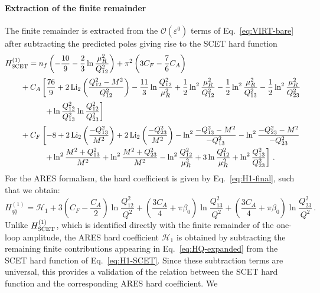 \paragraph{Extraction of the finite remainder}
The finite remainder is extracted from the
$\mathcal{O}(\varepsilon^0)$ terms of Eq.~\eqref{eq:VIRT-bare}
after subtracting the predicted poles giving rise to
the SCET hard function
\begin{equation}
\label{eq:H1-SCET}
\begin{aligned}
& H^{(1)}_{\rm SCET}=n_f\left(-\frac{10}{9}-\frac{2}{3}\ln\frac{\mu_R^2}{Q_{12}^2}\right)+\pi^2\left(
3C_F-\frac{7}{6}C_A
\right)\\[0.5ex]
& \qquad+C_A\left[
\frac{76}{9}
+2\operatorname{Li}_2\left(\frac{Q_{12}^2-M^2}{Q_{12}^2}\right)
-\frac{11}{3}\ln\frac{Q_{12}^2}{\mu_R^2}
+\frac{1}{2}\ln^2\frac{\mu_R^2}{Q_{12}^2}
-\frac{1}{2}\ln^2\frac{\mu_R^2}{Q_{13}^2}
-\frac{1}{2}\ln^2\frac{\mu_R^2}{Q_{23}^2}\right.\\[0.5ex]
&\quad\qquad\qquad\left.+\ln\frac{Q_{12}^2}{Q_{13}^2}
 \ln\frac{Q_{12}^2}{Q_{23}^2}
\right]\\[0.5ex]
&\qquad+C_F\left[-8
+2\operatorname{Li}_2\left(\frac{-Q_{13}^2}{M^2}\right)
+2\operatorname{Li}_2\left(\frac{-Q_{23}^2}{M^2}\right)
-\ln^2\frac{-Q_{13}^2-M^2}{-Q_{13}^2}
-\ln^2\frac{-Q_{23}^2-M^2}{-Q_{23}^2}\right.\\
&\quad\qquad\qquad\left.
+\ln^2\frac{M^2+Q_{13}^2}{M^2}
+\ln^2\frac{M^2+Q_{23}^2}{M^2}
-\ln^2\frac{Q_{12}^2}{\mu_R^2}
+3\ln\frac{Q_{12}^2}{\mu_R^2}
+\ln^2\frac{Q_{13}^2}{Q_{23}^2}
\right]\,.
\end{aligned}
\end{equation}
For the \textsc{ARES} formalism, the hard coefficient is given by
Eq.~\eqref{eq:H1-final}, such that we obtain: 
\begin{equation}
H_{q\bar{q}}^{(1)}=\mathcal{H}_1
+3\left(C_F-\frac{C_A}{2}\right)\ln\frac{Q_{12}^2}{Q^2}
+\left(\frac{3C_A}{4}+\pi\beta_0\right)\ln\frac{Q_{13}^2}{Q^2}
+\left(\frac{3C_A}{4}+\pi\beta_0\right)\ln\frac{Q_{23}^2}{Q^2}\,.
\end{equation}
Unlike $H_{\rm SCET}^{(1)}$, which is identified directly with the finite
remainder of the one-loop amplitude, the \textsc{ARES} hard coefficient
$\mathcal H_1$ is obtained by subtracting the remaining finite
contributions appearing in Eq.~\eqref{eq:HQ-expanded} from the SCET hard
function of Eq.~\eqref{eq:H1-SCET}. Since these subtraction terms are
universal, this provides a validation of the relation between the SCET
hard function and the corresponding \textsc{ARES} hard coefficient. We
